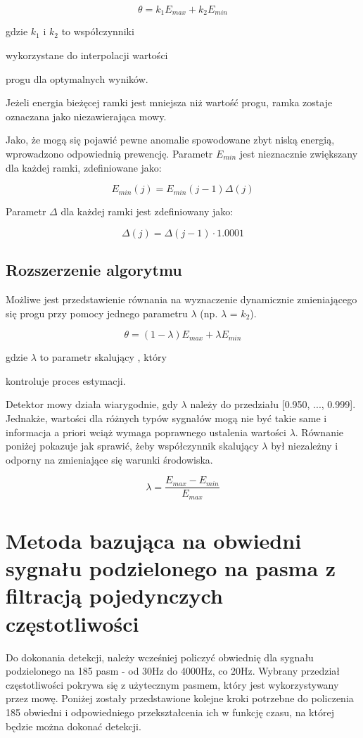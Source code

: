 \documentclass[eng,printmode]{mgr}
\begin{document}
 $$\theta = k_{1}E_{max} + k_{2}E_{min}$$
 
  \hspace{8cm} gdzie $k_{1}$ i $k_{2}$ to współczynniki 
  
  \hspace{8cm}wykorzystane do interpolacji wartości
  
  \hspace{8cm} progu dla optymalnych wyników.\vspace{5mm} 
  
  Jeżeli energia bieżęcej ramki jest mniejsza niż wartość progu, ramka zostaje oznaczana jako niezawierająca mowy. 
  
  Jako, że mogą się pojawić pewne anomalie spowodowane zbyt niską energią, wprowadzono odpowiednią prewencję. Parametr $E_{min}$ jest nieznacznie zwiększany dla każdej ramki, zdefiniowane jako:
  
  $$E_{min}(j) = E_{min}(j-1)\Delta(j)$$
  
  Parametr $\Delta$ dla każdej ramki jest zdefiniowany jako:
  
  $$\Delta(j) = \Delta(j-1) \cdot1.0001$$
  
  \subsection{Rozszerzenie algorytmu}
  Możliwe jest przedstawienie równania na wyznaczenie dynamicznie zmieniającego się progu przy pomocy jednego parametru $\lambda$ (np. $\lambda$ = $k_{2}$).
  
  $$\theta = (1-\lambda)E_{max} + \lambda E_{min}$$
  
  \hspace{8cm}gdzie $\lambda$ to parametr skalujący , który 
  
  \hspace{8cm}kontroluje proces estymacji.
  
  Detektor mowy działa wiarygodnie, gdy $\lambda$ należy do przedziału [0.950, ..., 0.999]. Jednakże, wartości dla różnych typów sygnałów mogą nie być takie same i informacja a priori wciąż wymaga poprawnego ustalenia wartości $\lambda$. Równanie poniżej pokazuje jak sprawić, żeby współczynnik skalujący $\lambda$ był niezależny i odporny na zmieniające się warunki środowiska.
  
  $$\lambda = \frac{E_{max}-E_{min}}{E_{max}}$$ 
		
\newpage
 \section{Metoda bazująca na obwiedni sygnału podzielonego na pasma z filtracją pojedynczych częstotliwości}
 Do dokonania detekcji, należy wcześniej policzyć obwiednię dla sygnału podzielonego na 185 pasm - od 30Hz do 4000Hz, co 20Hz. Wybrany przedział częstotliwości pokrywa się z użytecznym pasmem, który jest wykorzystywany przez mowę. Poniżej zostały przedstawione kolejne kroki potrzebne do policzenia 185 obwiedni i odpowiedniego przekształcenia ich w funkcję czasu, na której będzie można dokonać detekcji.
 
\end{document}
